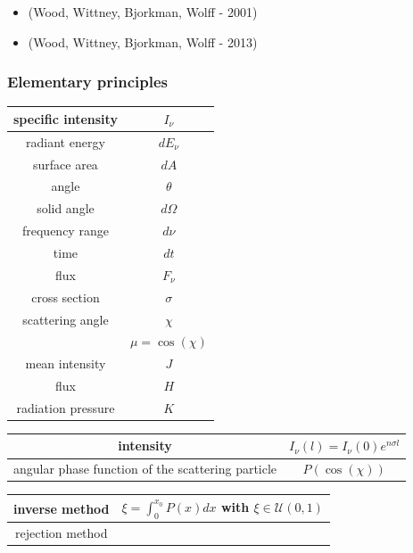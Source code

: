 \documentclass[../main/main.tex]{subfiles}
\begin{document}
\begin{itemize}
\item (Wood, Wittney, Bjorkman, Wolff - 2001)
\item (Wood, Wittney, Bjorkman, Wolff - 2013)
\end{itemize}

\subsubsection{Elementary principles}

\begin{center}
\centering
{\tabulinesep=1.5mm
\begin{tabu}{|c|c|}
\hline 
specific intensity & $I_{\nu}$ \\ \hline
radiant energy & $dE_{\nu}$ \\ \hline
surface area & $dA$ \\ \hline
angle & $\theta$ \\ \hline
solid angle & $d \Omega$ \\ \hline
frequency range & $d \nu$ \\ \hline
time & $dt$ \\ \hline
flux & $F_{\nu}$ \\ \hline
cross section & $\sigma$ \\ \hline
scattering angle & $\chi$ \\ 
 & $\mu = \cos(\chi)$ \\ \hline
mean intensity & $J$ \\ \hline
flux & $H$ \\ \hline
radiation pressure & $K$ \\ \hline
\end{tabu}}
\end{center}


\begin{center}
\centering
{\tabulinesep=1.5mm
\begin{tabu}{|c|c|}
\hline 
intensity & $I_{\nu}(l) = I_{\nu}(0)e^{n \sigma l}$ \\ \hline
angular phase function of the scattering particle & $P(\cos(\chi))$ \\ \hline

\end{tabu}}
\end{center}

\begin{center}
\centering
{\tabulinesep=1.5mm
\begin{tabu}{|c|c|}
\hline 
inverse method & $\xi = \int_0 ^{x_0} P(x) dx $ with $\xi \in \mathcal{U}(0,1)$ \\ \hline

rejection method & \\ \hline
\end{tabu}}
\end{center}
\end{document}
